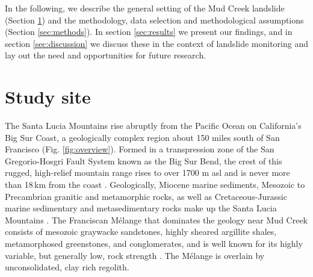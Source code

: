 \documentclass[nhess, manuscript]{copernicus}
\begin{document}
In the following, we describe the general setting of the Mud Creek landslide (Section \ref{sec:study_site}) and the methodology, data selection and methodological assumptions (Section \ref{sec:methods}). In section \ref{sec:results} we present our findings, and in section \ref{sec:discussion} we discuss these in the context of landslide monitoring and lay out the need and opportunities for future research. 






\section{Study site}
\label{sec:study_site}
The Santa Lucia Mountains rise abruptly from the Pacific Ocean on California's Big Sur Coast, a geologically complex region about 150 miles south of San Francisco (Fig. \ref{fig:overview}). Formed in a transpression zone of the San Gregorio-Hosgri Fault System known as the Big Sur Bend, the crest of this rugged, high-relief mountain range rises to over 1700 m asl and is never more than 18\,km from the coast \citep{Johnson2018}. Geologically, Miocene marine sediments, Mesozoic to Precambrian granitic and metamorphic rocks, as well as Cretaceous-Jurassic marine sedimentary and metasedimentary rocks make up the Santa Lucia Mountains \citep{graham1978}. The Franciscan Mélange that dominates the geology near Mud Creek consists of mesozoic graywacke sandstones, highly sheared argillite shales, metamorphosed greenstones, and conglomerates, and is well known for its highly variable, but generally low, rock strength \citep{medley2011, californiageologicsurvey}. The Mélange is overlain by unconsolidated, clay rich regolith. \par 
\end{document}
